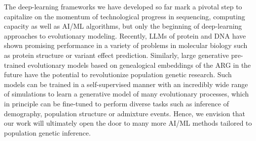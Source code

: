 The deep-learning frameworks we have developed so far mark a pivotal step to capitalize on the momentum of technological progress in sequencing, computing capacity as well as \ac{AI}/\ac{ML} algorithms, but only the beginning of deep-learning approaches to evolutionary modeling. Recently, \acp{LLM} of protein and DNA have shown promising performance in a variety of problems in molecular biology such as protein structure or variant effect prediction. Similarly, large generative pre-trained evolutionary models based on genealogical embeddings of the \ac{ARG} in the future have the potential to revolutionize population genetic research. Such models can be trained in a self-supervised manner with an incredibly wide range of simulations to learn a generative model of many evolutionary processes, which in principle can be fine-tuned to perform diverse tasks such as inference of demography, population structure or admixture events. Hence, we envision that our work will ultimately open the door to many more \ac{AI}/\ac{ML} methods tailored to population genetic inference.

